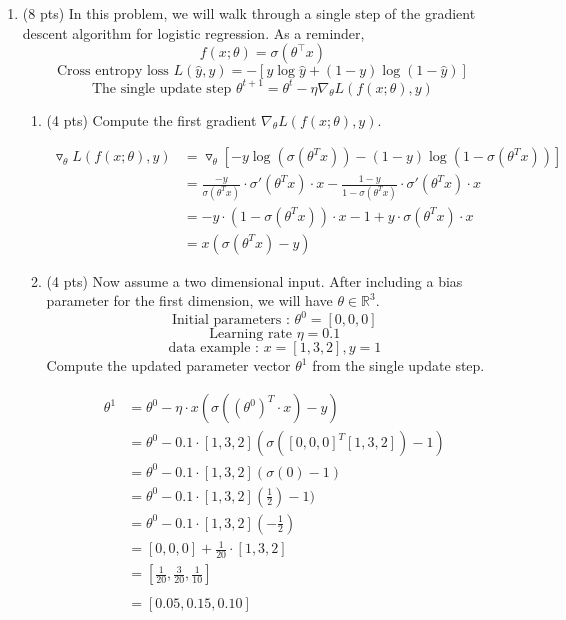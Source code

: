 \documentclass[a4paper]{article}
\theoremstyle{definition}
\newenvironment{soln}{
    \leavevmode\color{blue}\ignorespaces
}{}
\begin{document}
\begin{enumerate}
\item (8 pts) In this problem, we will walk through a single step of the gradient descent algorithm for logistic regression. As a reminder,
$$f(x;\theta) = \sigma(\theta^\top x)$$
$$\text{Cross entropy loss } L(\hat{y}, y) = -[y \log  \hat{y} + (1-y)\log(1-\hat{y})]$$
$$\text{The single update step } \theta^{t+1} = \theta^{t} - \eta \nabla_{\theta} L(f(x;\theta), y) $$



\begin{enumerate}
	\item (4 pts) Compute the first gradient $\nabla_{\theta} L(f(x;\theta), y)$.
	
	\begin{soln}
            \begin{align*}
                \triangledown_\theta L(f(x;\theta),y) &= \triangledown_\theta[-y\log(\sigma(\theta^Tx))-(1-y)\log(1-\sigma(\theta^Tx))]\\
                &= \frac{-y}{\sigma(\theta^Tx)}\cdot\sigma'(\theta^Tx)\cdot x-\frac{1-y}{1-\sigma(\theta^Tx)}\cdot\sigma'(\theta^Tx)\cdot x\\
                &= -y\cdot(1-\sigma(\theta^Tx))\cdot x-1+y\cdot\sigma(\theta^Tx)\cdot x\\
                & = x(\sigma(\theta^Tx)-y)
                \end{align*}
        \end{soln}
	
	\item (4 pts)
 Now assume a two dimensional input. After including a bias parameter for the first dimension, we will have $\theta\in\mathbb{R}^3$.
$$ \text{Initial parameters : }  \theta^{0}=[0, 0, 0]$$
$$ \text{Learning rate }\eta=0.1$$
$$ \text{data example : } x=[1, 3, 2], y=1$$
Compute the updated parameter vector $\theta^{1}$ from the single update step.
	
	\begin{soln}
            \begin{align*}
                \theta^1 &= \theta^0 - \eta\cdot x(\sigma((\theta^0)^T\cdot x)-y)\\
                &= \theta^0 - 0.1\cdot[1,3,2](\sigma([0,0,0]^T[1,3,2])-1)\\
                &= \theta^0 - 0.1\cdot[1,3,2](\sigma(0)-1)\\
                &= \theta^0 - 0.1\cdot[1,3,2](\frac{1}{2})-1)\\
                &= \theta^0 - 0.1\cdot[1,3,2](-\frac{1}{2})\\
                &= [0,0,0] + \frac{1}{20}\cdot[1,3,2]\\
                &= [\frac{1}{20}, \frac{3}{20}, \frac{1}{10}]\\\\
                &= [0.05, 0.15, 0.10]
            \end{align*}
        \end{soln}
\end{enumerate}
\end{enumerate}
\end{document}
